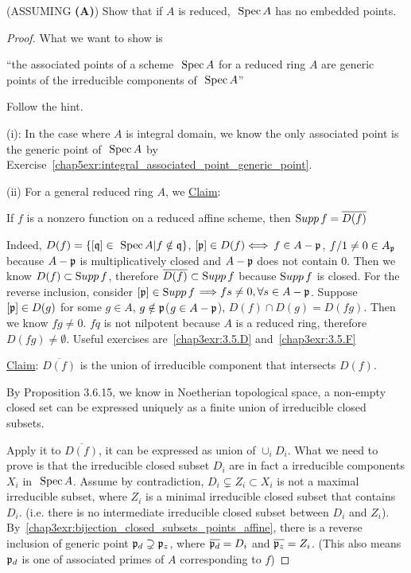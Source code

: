 \begin{exr}(ASSUMING \textbf{(A)})
Show that if $A$ is reduced, $\text{ Spec\,} A$ has no embedded points.
\end{exr}
\begin{proof}
What we want to show is 

``the associated points of a scheme $\text{ Spec\,} A$ for a reduced ring $A$ are generic points of the irreducible components of $\text{ Spec\,} A$''

Follow the hint.

(i): In the case where $A$ is integral domain, we know the only associated point is the generic point of $\text{ Spec\,} A$ by Exercise~\ref{chap5exr:integral_associated_point_generic_point}.

(ii) For a general reduced ring $A$, we \underline{Claim}:

If $f$ is a nonzero function on a reduced affine scheme,  then ${\text Supp\thinspace} f = \overline{D(f)}$

Indeed, $D(f)=\{[\mathfrak q]\in\text{ Spec\,} A|f\notin \mathfrak q\}$, $[{\mathfrak p}]\in D(f)\Longleftrightarrow$ $f\in A-{\mathfrak p}$, $f/1\neq 0\in A_{\mathfrak p}$ because $A-{\mathfrak p}$ is multiplicatively closed and $A-{\mathfrak p}$ does not contain $0$. Then we know $D(f)\subset {\text Supp\thinspace} f$, therefore $\overline{D(f)}\subset{\text Supp\thinspace} f$ because ${\text Supp\thinspace} f$ is closed. 
For the reverse inclusion, consider $[{\mathfrak p}]\in{\text Supp\thinspace} f$ $\Longrightarrow fs\neq 0, \forall s\in A-{\mathfrak p}$. Suppose $[{\mathfrak p}]\in D(g)$ for some $g\in A$, $g\notin {\mathfrak p}$($g\in A-{\mathfrak p}$), $D(f)\cap D(g)=D(fg)$. Then we know $fg\neq 0$. $fq$ is not nilpotent because $A$ is a reduced ring, therefore $D(fg)\neq \emptyset$. Useful exercises are~\ref{chap3exr:3.5.D} and~\ref{chap3exr:3.5.F}

\underline{Claim}: $\overline{D(f)}$ is the union of irreducible component that intersects $D(f)$. 

By Proposition 3.6.15, we know in Noetherian topological space, a non-empty closed set can be expressed uniquely as a finite union of irreducible closed subsets.

 Apply it to $\overline{D(f)}$, it can be expressed as union of $\cup_i D_i$. What we need to prove is that the irreducible closed subset $D_i$ are in fact a irreducible components $X_i$ in $\text{ Spec\,} A$. 
Assume by contradiction, $D_i\subsetneq Z_i\subset X_i$ is not a maximal irreducible subset, where $Z_i$ is a minimal irreducible closed subset that contains $D_i$. (i.e. there is no intermediate irreducible closed subset between $D_i$ and $Z_i$). By~\ref{chap3exr:bijection_closed_subsets_points_affine}, there is a reverse inclusion of generic point ${\mathfrak p}_d\supsetneq {\mathfrak p}_z$, where $\overline{{\mathfrak p}_d}=D_i$ and $\overline{{\mathfrak p}_z}=Z_i$. (This also means ${\mathfrak p}_d$ is one of  associated primes of $A$ corresponding to $f$)


\end{proof}
